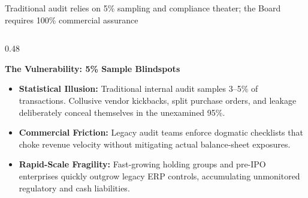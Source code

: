 \documentclass[aspectratio=169, 8pt]{beamer}
\begin{document}
\begin{frame}{Traditional audit relies on 5\% sampling and compliance theater; the Board requires 100\% commercial assurance}
    \vspace{-0.15cm}
    \begin{columns}[T]
        \begin{column}{0.48\textwidth}
            \begin{tcolorbox}[colback=cardBg, colframe=cardBorder, arc=1pt, boxrule=0.6pt, left=4pt, right=4pt, top=3pt, bottom=3pt]
                \textbf{\normalsize \color{obsidian} The Vulnerability: 5\% Sample Blindspots}
            \end{tcolorbox}
            \vspace{0.1cm}
            \begin{itemize}
                \setlength{\itemsep}{3.5pt}
                \item \textbf{Statistical Illusion:} Traditional internal audit samples 3--5\% of transactions. Collusive vendor kickbacks, split purchase orders, and leakage deliberately conceal themselves in the unexamined 95\%.
                \item \textbf{Commercial Friction:} Legacy audit teams enforce dogmatic checklists that choke revenue velocity without mitigating actual balance-sheet exposures.
                \item \textbf{Rapid-Scale Fragility:} Fast-growing holding groups and pre-IPO enterprises quickly outgrow legacy ERP controls, accumulating unmonitored regulatory and cash liabilities.
            \end{itemize}
        \end{column}
        

\end{columns}
\end{frame}
\end{document}

